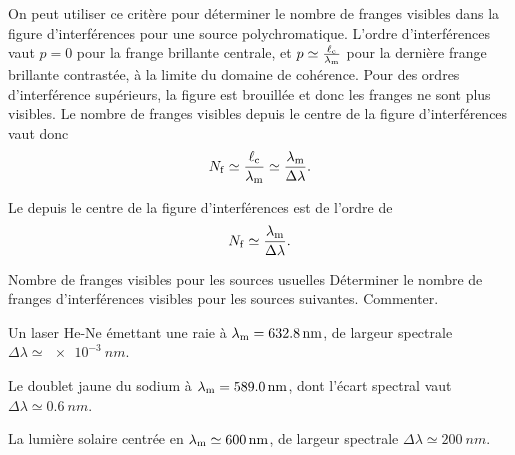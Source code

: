 \documentclass[12pt,fancy]{cours}
\begin{document}
On peut utiliser ce critère pour déterminer le nombre de franges visibles dans la figure d’interférences pour une source polychromatique.
L'ordre d'interférences vaut $p=0$ pour la frange brillante centrale, et $p \simeq \frac{\ell_{\rm c}}{\lambda_{\rm m}}$ pour la dernière frange brillante contrastée, à la limite du domaine de cohérence. Pour des ordres d’interférence supérieurs, la figure est brouillée et donc les franges ne sont plus visibles.
Le nombre de franges visibles depuis le centre de la figure d'interférences vaut donc 
\begin{equation}
  N_{\rm{f}}\simeq\frac{\ell_{\rm c}}{\lambda_{\rm m}} \simeq \frac{\lambda_{\rm m}}{\Delta\lambda}.
\end{equation}
\begin{prop}\label{prop:Nf}
Le  depuis le centre de la figure d'interférences est de l'ordre de 
  $$
  N_{\rm{f}}\simeq\frac{\lambda_{\rm m}}{\Delta\lambda}.
  $$
\end{prop}

\begin{exemple}{Nombre de franges visibles pour les sources usuelles}
  Déterminer le nombre de franges d'interférences visibles pour les sources suivantes. Commenter.
  \begin{quest}
    \item	Un laser He-Ne émettant une raie à $\lambda_{\rm m}=\SI{632.8}{nm}$, de largeur spectrale $\Delta\lambda\simeq\SI{e-3}{nm}$.
    \item Le doublet jaune du sodium à $\lambda_{\rm m}=\SI{589.0}{nm}$, dont l’écart spectral vaut $\Delta\lambda\simeq\SI{0.6}{nm}$.
    \item La lumière solaire centrée en $\lambda_{\rm m}\simeq\SI{600}{nm}$, de largeur spectrale $\Delta\lambda \simeq \SI{200}{nm}$.
  \end{quest}
\end{exemple}
\end{document}
